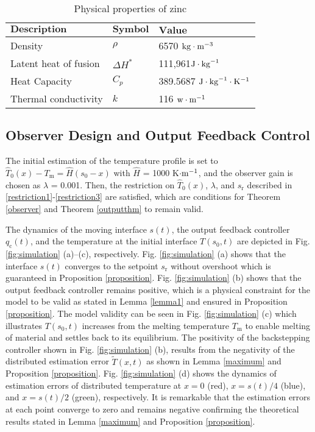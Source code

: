 \documentclass[journal]{IEEEtran}
\begin{document}
	\begin{table}[t]
\caption{Physical properties of zinc}
\begin{center}
    \begin{tabular}{| l | l | l | }
    \hline
    $\textbf{Description}$ & $\textbf{Symbol}$ & $\textbf{Value}$ \\ \hline
    Density & $\rho$ & 6570 ${\rm kg}\cdot {\rm m}^{-3}$\\ 
    Latent heat of fusion & $\Delta H^*$ & 111,961${\rm J}\cdot {\rm kg}^{-1}$ \\ 
    Heat Capacity & $C_p$ & 389.5687 ${\rm J} \cdot {\rm kg}^{-1}\cdot {\rm K}^{-1}$  \\  
    Thermal conductivity & $k$ & 116 ${\rm w}\cdot {\rm m}^{-1}$  \\ \hline
    \end{tabular}
\end{center}
\end{table}

\subsection{Observer Design and Output Feedback Control}

The initial estimation of the temperature profile is set to $\hat{T}_0(x)-T_{{\mathrm m}}=\hat{H}(s_{0}-x)$ with $\hat{H}$ = 1000 K$\cdot {\rm m}^{-1}$, and the observer gain  is chosen as $\lambda$ = 0.001. Then, the restriction on $\hat{T}_0(x)$, $\lambda$, and $s_{{\mathrm r}}$ described in \eqref{restriction1}-\eqref{restriction3} are satisfied, which are conditions for Theorem \ref{observer} and Theorem \ref{outputthm} to remain valid. 

The dynamics of the moving interface $s(t)$, the output feedback controller $q_{{\mathrm c}}(t)$, and the temperature at the initial interface $T(s_0,t)$ are depicted in Fig. \ref{fig:simulation} (a)--(c), respectively. Fig. \ref{fig:simulation} (a) shows that the interface $s(t)$ converges to the setpoint $s_{{\mathrm r}}$ without overshoot which is guaranteed in Proposition \ref{proposition}.  Fig. \ref{fig:simulation} (b) shows that the output feedback controller remains positive, which is a physical constraint for the model to be valid as stated in Lemma \ref{lemma1} and ensured in Proposition \ref{proposition}. The model validity can be seen in Fig. \ref{fig:simulation} (c) which illustrates $T(s_0,t)$ increases from the melting temperature $T_{{\mathrm m}}$  to enable melting of material and settles back to its equilibrium. The positivity of the backstepping  controller shown in Fig. \ref{fig:simulation} (b), results from the negativity of the distributed estimation error $\tilde{T}(x,t)$ as shown in Lemma \ref{maximum} and Proposition \ref{proposition}. Fig. \ref{fig:simulation} (d) shows the dynamics of estimation errors of distributed temperature at $x=0$ (red), $x=s(t)/4$ (blue), and $x=s(t)/2$ (green), respectively. It is remarkable that the estimation errors at each point converge to zero and remains negative confirming  the theoretical results stated in Lemma \ref{maximum} and Proposition \ref{proposition}. 
\end{document}
